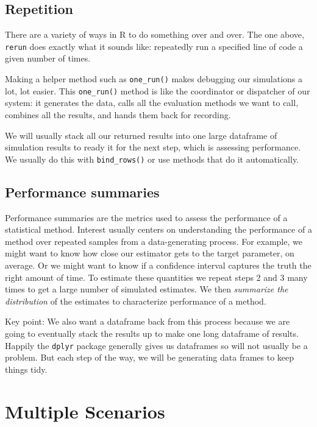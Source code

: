 \documentclass[
]{book}
\begin{document}
\hypertarget{repetition}{%
\subsection{Repetition}\label{repetition}}

There are a variety of ways in R to do something over and over.
The one above, \texttt{rerun} does exactly what it sounds like: repeatedly run a specified line of code a given number of times.

Making a helper method such as \texttt{one\_run()} makes debugging our simulations a lot, lot easier.
This \texttt{one\_run()} method is like the coordinator or dispatcher of our system: it generates the data, calls all the evaluation methods we want to call, combines all the results, and hands them back for recording.

We will usually stack all our returned results into one large dataframe of simulation results to ready it for the next step, which is assessing performance.
We usually do this with \texttt{bind\_rows()} or use methods that do it automatically.

\hypertarget{performance-summaries}{%
\subsection{Performance summaries}\label{performance-summaries}}

Performance summaries are the metrics used to assess the performance of a statistical method.
Interest usually centers on understanding the performance of a method over repeated samples from a data-generating process.
For example, we might want to know how close our estimator gets to the target parameter, on average.
Or we might want to know if a confidence interval captures the truth the right amount of time.
To estimate these quantities we repeat steps 2 and 3 many times to get a large number of simulated estimates.
We then \emph{summarize the distribution} of the estimates to characterize performance of a method.

Key point: We also want a dataframe back from this process because we are going to eventually stack the
results up to make one long dataframe of results. Happily the \texttt{dplyr}
package generally gives us dataframes so will not usually be a problem.
But each step of the way, we will be generating data frames to keep things tidy.

\hypertarget{multiple-scenarios}{%
\section{Multiple Scenarios}\label{multiple-scenarios}}
\end{document}
